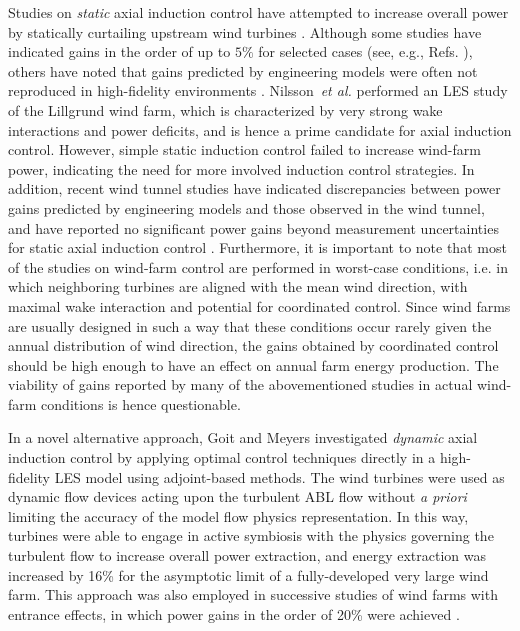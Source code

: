 \documentclass[energies,article,submit,moreauthors,latex,10pt,a4paper]{mdpi}
\begin{document}
Studies on \emph{static} axial induction control have attempted to increase overall power by statically curtailing upstream wind turbines \cite{knudsen2015survey}. Although some studies have indicated gains in the order of up to $5\%$ for selected cases (see, e.g., Refs. \cite{horvat2012quasi, johnson2012assessment, gebraad2015maximum}), others have noted that gains predicted by engineering models were often not reproduced in high-fidelity environments \cite{annoni2016analysis}. Nilsson~\emph{et al.} \cite{nilsson2015large} performed an LES study of the Lillgrund wind farm, which is characterized by very strong wake interactions and power deficits, and is hence a prime candidate for axial induction control. However, simple static induction control failed to increase wind-farm power, indicating the need for more involved induction control strategies. In addition, recent wind tunnel studies have indicated discrepancies between power gains predicted by engineering models and those observed in the wind tunnel, and have reported no significant power gains beyond measurement uncertainties for static axial induction control  \cite{campagnolo2016wind, bartl2016experimental}. Furthermore, it is important to note that most of the studies on wind-farm control are performed in worst-case conditions, i.e. in which neighboring turbines are aligned with the mean wind direction, with maximal wake interaction and potential for coordinated control. Since wind farms are usually designed in such a way that these conditions occur rarely given the annual distribution of wind direction, the gains obtained by coordinated control should be high enough to have an effect on annual farm energy production. The viability of gains reported by many of the abovementioned studies in actual wind-farm conditions is hence questionable.  

In a novel alternative approach, Goit and Meyers \cite{goit2015optimal} investigated \emph{dynamic} axial induction control by applying optimal control techniques directly in a high-fidelity LES model using adjoint-based methods. The wind turbines were used as dynamic flow devices acting upon the turbulent ABL flow without \emph{a priori} limiting the accuracy of the model flow physics representation. In this way, turbines were able to engage in active symbiosis with the physics governing the turbulent flow to increase overall power extraction, and energy extraction was increased by 16\% for the asymptotic limit of a fully-developed very large wind farm. This approach was also employed in successive studies of wind farms with entrance effects, in which power gains in the order of 20\% were achieved \cite{goit2016optimal, munters2016effect, munters2017optimal}. 
\end{document}
